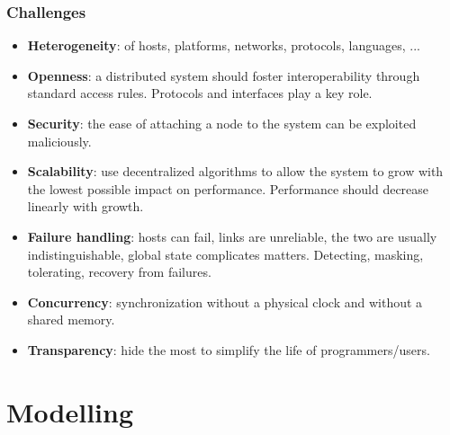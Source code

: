 \documentclass[10pt,a4paper]{article}
\begin{document}
\subsubsection{Challenges}
\begin{itemize}
	\item \textbf{Heterogeneity}: of hosts, platforms, networks, protocols, languages, ...
	\item \textbf{Openness}: a distributed system should foster interoperability through standard access rules. Protocols and interfaces play a key role.
	\item \textbf{Security}: the ease of attaching a node to the system can be exploited maliciously.
	\item \textbf{Scalability}: use decentralized algorithms to allow the system to grow with the lowest possible impact on performance. Performance should decrease linearly with growth.
	\item \textbf{Failure handling}: hosts can fail, links are unreliable, the two are usually indistinguishable, global state complicates matters. Detecting, masking, tolerating, recovery from failures.
	\item \textbf{Concurrency}: synchronization without a physical clock and without a shared memory.
	\item \textbf{Transparency}: hide the most to simplify the life of programmers/users.
\end{itemize}
\pagebreak
\section{\LARGE Modelling}
\end{document}

